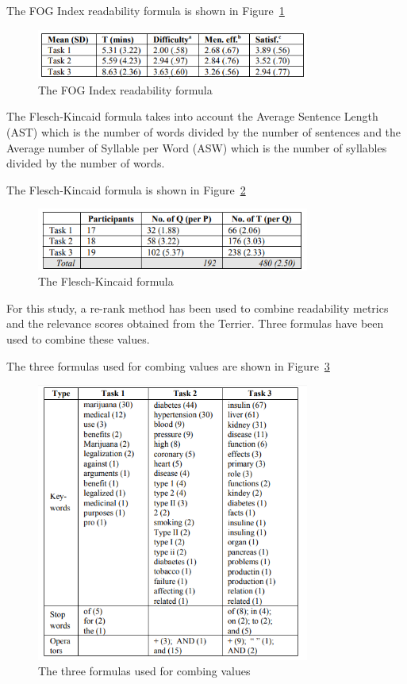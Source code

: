 \documentclass[]{article}
\begin{document}
The FOG Index readability formula is shown in Figure~\ref{fig15}

\begin{figure}[t!]
	\includegraphics[width=0.8\textwidth]{Capture15.png}
	\caption{The FOG Index readability formula \label{fig15}}
\end{figure}

The Flesch-Kincaid formula takes into account the Average Sentence Length (AST) which is the number of words divided by the number of sentences and the Average number of Syllable per Word (ASW) which is the number of syllables divided by the number of words. 
    
The Flesch-Kincaid formula is shown in Figure~\ref{fig16}

\begin{figure}[b!]
	\includegraphics[width=0.8\textwidth]{Capture16.png}
	\caption{The Flesch-Kincaid formula \label{fig16}}
\end{figure}

For this study, a re-rank method has been used to combine readability metrics and the relevance  scores obtained from the Terrier. Three formulas have been used to combine these values.
 
The three formulas used for combing values are shown in Figure~\ref{fig17}

\begin{figure}[t!]
	\includegraphics[width=0.8\textwidth]{Capture17.png}
	\caption{The three formulas used for combing values \label{fig17}}
\end{figure}
\end{document}
